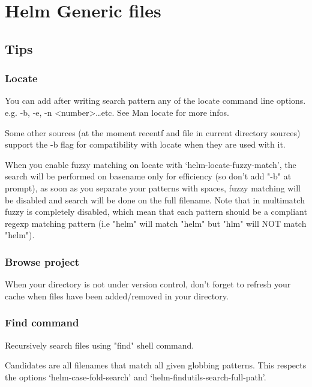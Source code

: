 \documentclass[11pt]{article}
\begin{document}
\section{Helm Generic files}
\label{sec:org8454a25}

\subsection{Tips}
\label{sec:org420a85e}

\subsubsection{Locate}
\label{sec:org79223dc}

You can add after writing search pattern any of the locate command line options.
e.g. -b, -e, -n <number>\ldots{}etc.
See Man locate for more infos.

Some other sources (at the moment recentf and file in current directory sources)
support the -b flag for compatibility with locate when they are used with it.

When you enable fuzzy matching on locate with
‘helm-locate-fuzzy-match’, the search will be performed on basename
only for efficiency (so don’t add "-b" at prompt), as soon as you
separate your patterns with spaces, fuzzy matching will be disabled
and search will be done on the full filename.  Note that in multimatch
fuzzy is completely disabled, which mean that each pattern should be a
compliant regexp matching pattern (i.e "helm" will match "helm"
but "hlm" will NOT match "helm").

\subsubsection{Browse project}
\label{sec:orge0ea400}

When your directory is not under version control,
don’t forget to refresh your cache when files have been added/removed in your directory.

\subsubsection{Find command}
\label{sec:orgf7e9fdd}

Recursively search files using "find" shell command.

Candidates are all filenames that match all given globbing patterns.
This respects the options ‘helm-case-fold-search’ and
‘helm-findutils-search-full-path’.
\end{document}
